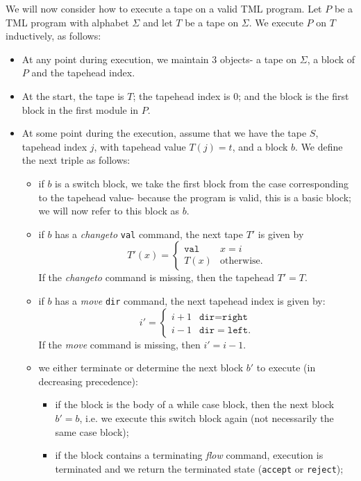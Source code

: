 We will now consider how to execute a tape on a valid TML program. Let $P$ be a TML program with alphabet $\Sigma$ and let $T$ be a tape on $\Sigma$. We execute $P$ on $T$ inductively, as follows:
\begin{itemize}
    \item At any point during execution, we maintain 3 objects- a tape on $\Sigma$, a block of $P$ and the tapehead index. 
    \item At the start, the tape is $T$; the tapehead index is $0$; and the block is the first block in the first module in $P$. 
    \item At some point during the execution, assume that we have the tape $S$, tapehead index $j$, with tapehead value $T(j) = t$, and a block $b$. We define the next triple as follows:
    \begin{itemize}
        \item if $b$ is a switch block, we take the first block from the case corresponding to the tapehead value- because the program is valid, this is a basic block; we will now refer to this block as $b$.
        \item if $b$ has a \textit{changeto} \texttt{val} command, the next tape $T'$ is given by 
        \[T'(x) = \begin{cases}
            \texttt{val} & x = i \\
            T(x) & \text{otherwise}.
        \end{cases}\]
        If the \textit{changeto} command is missing, then the tapehead $T' = T$.
        \item if $b$ has a \textit{move} \texttt{dir} command, the next tapehead index is given by:
        \[i' = \begin{cases}
            i+1 & \texttt{dir} = \texttt{right} \\
            i-1 & \texttt{dir} = \texttt{left}.
        \end{cases}\]
        If the \textit{move} command is missing, then $i' = i-1$.
        \item we either terminate or determine the next block $b'$ to execute (in decreasing precedence):
        \begin{itemize}
            \item if the block is the body of a while case block, then the next block $b' = b$, i.e. we execute this switch block again (not necessarily the same case block);
            \item if the block contains a terminating \textit{flow} command, execution is terminated and we return the terminated state (\texttt{accept} or \texttt{reject});

\end{itemize}
\end{itemize}
\end{itemize}
